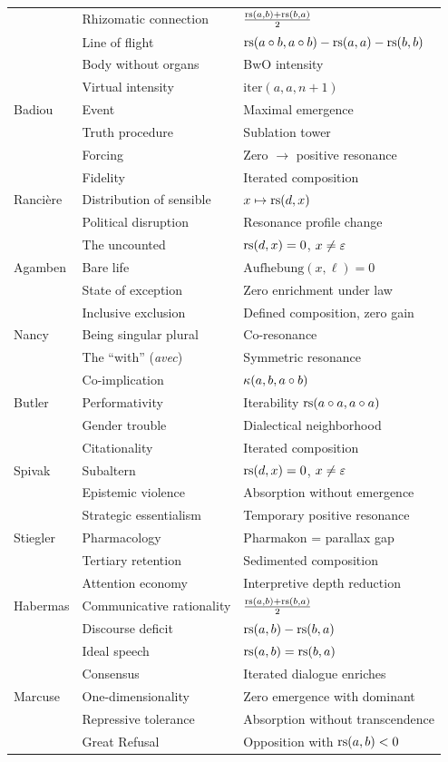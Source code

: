 \begin{center}
\begin{tabular}{lll}
& Rhizomatic connection & $\frac{\mathrm{rs}(a,b) + \mathrm{rs}(b,a)}{2}$ \\
& Line of flight & $\mathrm{rs}(a \circ b, a \circ b) - \mathrm{rs}(a,a) - \mathrm{rs}(b,b)$ \\
& Body without organs & BwO intensity \\
& Virtual intensity & $\mathrm{iter}(a, a, n+1)$ \\
\hline
Badiou & Event & Maximal emergence \\
& Truth procedure & Sublation tower \\
& Forcing & Zero $\to$ positive resonance \\
& Fidelity & Iterated composition \\
\hline
Rancière & Distribution of sensible & $x \mapsto \mathrm{rs}(d, x)$ \\
& Political disruption & Resonance profile change \\
& The uncounted & $\mathrm{rs}(d, x) = 0$, $x \neq \varepsilon$ \\
\hline
Agamben & Bare life & $\mathrm{Aufhebung}(x, \ell) = 0$ \\
& State of exception & Zero enrichment under law \\
& Inclusive exclusion & Defined composition, zero gain \\
\hline
Nancy & Being singular plural & Co-resonance \\
& The ``with'' (\textit{avec}) & Symmetric resonance \\
& Co-implication & $\kappa(a, b, a \circ b)$ \\
\hline
Butler & Performativity & Iterability $\mathrm{rs}(a \circ a, a \circ a)$ \\
& Gender trouble & Dialectical neighborhood \\
& Citationality & Iterated composition \\
\hline
Spivak & Subaltern & $\mathrm{rs}(d, x) = 0$, $x \neq \varepsilon$ \\
& Epistemic violence & Absorption without emergence \\
& Strategic essentialism & Temporary positive resonance \\
\hline
Stiegler & Pharmacology & Pharmakon = parallax gap \\
& Tertiary retention & Sedimented composition \\
& Attention economy & Interpretive depth reduction \\
\hline
Habermas & Communicative rationality & $\frac{\mathrm{rs}(a,b)+\mathrm{rs}(b,a)}{2}$ \\
& Discourse deficit & $\mathrm{rs}(a,b) - \mathrm{rs}(b,a)$ \\
& Ideal speech & $\mathrm{rs}(a,b) = \mathrm{rs}(b,a)$ \\
& Consensus & Iterated dialogue enriches \\
\hline
Marcuse & One-dimensionality & Zero emergence with dominant \\
& Repressive tolerance & Absorption without transcendence \\
& Great Refusal & Opposition with $\mathrm{rs}(a,b) < 0$ \\
\end{tabular}
\end{center}

